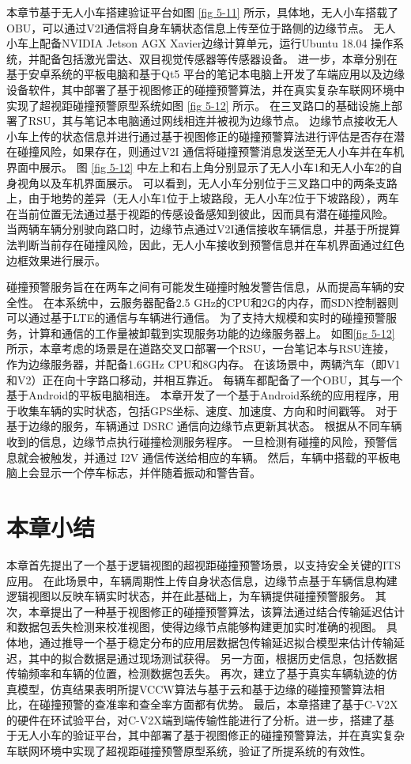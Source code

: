 本章节基于无人小车搭建验证平台如图 \ref{fig 5-11} 所示，具体地，无人小车搭载了OBU，可以通过V2I通信将自身车辆状态信息上传至位于路侧的边缘节点。
无人小车上配备NVIDIA Jetson AGX Xavier边缘计算单元，运行Ubuntu 18.04 操作系统，并配备包括激光雷达、双目视觉传感器等传感器设备。
进一步，本章分别在基于安卓系统的平板电脑和基于Qt5 平台的笔记本电脑上开发了车端应用以及边缘设备软件，其中部署了基于视图修正的碰撞预警算法，并在真实复杂车联网环境中实现了超视距碰撞预警原型系统如图 \ref{fig 5-12} 所示。
在三叉路口的基础设施上部署了RSU，其与笔记本电脑通过网线相连并被视为边缘节点。
边缘节点接收无人小车上传的状态信息并进行通过基于视图修正的碰撞预警算法进行评估是否存在潜在碰撞风险，如果存在，则通过V2I 通信将碰撞预警消息发送至无人小车并在车机界面中展示。
图 \ref{fig 5-12} 中左上和右上角分别显示了无人小车1和无人小车2的自身视角以及车机界面展示。
可以看到，无人小车分别位于三叉路口中的两条支路上，由于地势的差异（无人小车1位于上坡路段，无人小车2位于下坡路段），两车在当前位置无法通过基于视距的传感设备感知到彼此，因而具有潜在碰撞风险。
当两辆车辆分别驶向路口时，边缘节点通过V2I通信接收车辆信息，并基于所提算法判断当前存在碰撞风险，因此，无人小车接收到预警信息并在车机界面通过红色边框效果进行展示。

碰撞预警服务旨在在两车之间有可能发生碰撞时触发警告信息，从而提高车辆的安全性。
在本系统中，云服务器配备2.5 GHz的CPU和2G的内存，而SDN控制器则可以通过基于LTE的通信与车辆进行通信。
为了支持大规模和实时的碰撞预警服务，计算和通信的工作量被卸载到实现服务功能的边缘服务器上。
如图\ref{fig 5-12}所示，本章考虑的场景是在道路交叉口部署一个RSU，一台笔记本与RSU连接，作为边缘服务器，并配备1.6GHz CPU和8G内存。
在该场景中，两辆汽车（即V1和V2）正在向十字路口移动，并相互靠近。
每辆车都配备了一个OBU，其与一个基于Android的平板电脑相连。
本章开发了一个基于Android系统的应用程序，用于收集车辆的实时状态，包括GPS坐标、速度、加速度、方向和时间戳等。
对于基于边缘的服务，车辆通过 DSRC 通信向边缘节点更新其状态。
根据从不同车辆收到的信息，边缘节点执行碰撞检测服务程序。
一旦检测有碰撞的风险，预警信息就会被触发，并通过 I2V 通信传送给相应的车辆。
然后，车辆中搭载的平板电脑上会显示一个停车标志，并伴随着振动和警告音。

\section{本章小结}\label{section 5-6}

本章首先提出了一个基于逻辑视图的超视距碰撞预警场景，以支持安全关键的ITS应用。
在此场景中，车辆周期性上传自身状态信息，边缘节点基于车辆信息构建逻辑视图以反映车辆实时状态，并在此基础上，为车辆提供碰撞预警服务。
其次，本章提出了一种基于视图修正的碰撞预警算法，该算法通过结合传输延迟估计和数据包丢失检测来校准视图，使得边缘节点能够构建更加实时准确的视图。
具体地，通过推导一个基于稳定分布的应用层数据包传输延迟拟合模型来估计传输延迟，其中的拟合数据是通过现场测试获得。
另一方面，根据历史信息，包括数据传输频率和车辆的位置，检测数据包丢失。
再次，建立了基于真实车辆轨迹的仿真模型，仿真结果表明所提VCCW算法与基于云和基于边缘的碰撞预警算法相比，在碰撞预警的查准率和查全率方面都有优势。
最后，本章搭建了基于C-V2X的硬件在环试验平台，对C-V2X端到端传输性能进行了分析。进一步，搭建了基于无人小车的验证平台，其中部署了基于视图修正的碰撞预警算法，并在真实复杂车联网环境中实现了超视距碰撞预警原型系统，验证了所提系统的有效性。